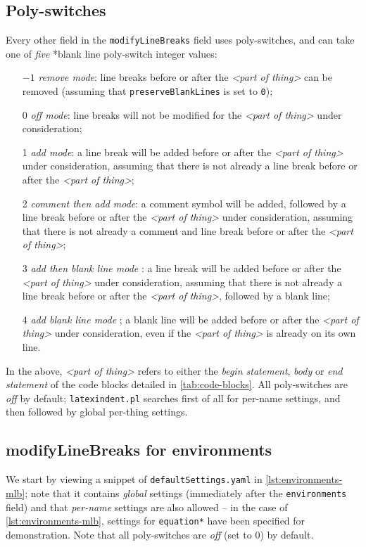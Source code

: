 \subsection{Poly-switches}\label{sec:poly-switches}
	Every other field in the \texttt{modifyLineBreaks} field uses poly-switches, and can
	take one of \emph{five}%
	*{blank line poly-switch} integer values:
	\begin{itemize}[font=\bfseries]
		\item[$-1$] \emph{remove mode}: line breaks before or after the
		      \emph{<part of thing>} can be removed (assuming that \texttt{preserveBlankLines} is
		      set to \texttt{0});
		\item[0] \emph{off mode}: line breaks will not be modified for the
		      \emph{<part of thing>} under consideration;
		\item[1] \emph{add mode}: a line break will be added before or after the
		      \emph{<part of thing>} under consideration, assuming that
		      there is not already a line break before or after the \emph{<part of thing>};
		\item[2] \emph{comment then add mode}: a comment symbol will be added, followed by a line break
		      before or after the \emph{<part of thing>} under consideration, assuming that there
		      is not already a comment and line break before or after the \emph{<part of thing>};
		\item[3] \emph{add then blank line mode}%
		      : a line break will be added before or after the
		      \emph{<part of thing>} under consideration, assuming that
		      there is not already a line break before or after the \emph{<part of thing>},
		      followed by a blank line;
		\item[4] \emph{add blank line mode}%
		      ; a blank line will
		      be added before or after the \emph{<part of thing>} under consideration, even if the
		      \emph{<part of thing>} is already on its own line.
	\end{itemize}
	In the above, \emph{<part of thing>} refers to either the
	\emph{begin statement}, \emph{body} or \emph{end statement}
	of the code blocks detailed in \vref{tab:code-blocks}. All poly-switches are
	\emph{off} by default; \texttt{latexindent.pl} searches first of all
	for per-name settings, and then followed by global per-thing settings.

\subsection{modifyLineBreaks for environments}\label{sec:modifylinebreaks-environments}
	We start by viewing a snippet of \texttt{defaultSettings.yaml} in
	\cref{lst:environments-mlb}; note that it contains \emph{global} settings
	(immediately after the \texttt{environments} field) and that
	\emph{per-name} settings are also allowed -- in the case of
	\cref{lst:environments-mlb}, settings for \texttt{equation*} have been specified
	for demonstration. Note that all poly-switches are \emph{off} (set to 0) by
	default.

